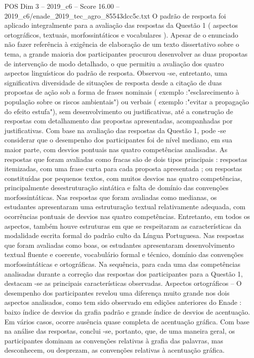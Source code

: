 \begin{textsample}{POS Dim 3 – 2019\_c6 – Score 16.00 – 2019\_c6/enade\_2019\_tec\_agro\_85543dcc5c.txt}
O padrão de resposta foi aplicado integralmente para a avaliação das respostas da Questão 1 ( aspectos ortográficos, textuais, morfossintáticos e vocabulares ).
Apesar de o enunciado não fazer referência à exigência de elaboração de um texto dissertativo sobre o tema, a grande maioria dos participantes procurou desenvolver as duas propostas de intervenção de modo detalhado, o que permitiu a avaliação dos quatro aspectos linguísticos do padrão de resposta.
Observou -se, entretanto, uma significativa diversidade de situações de resposta desde a citação de duas propostas de ação sob a forma de frases nominais ( exemplo :"esclarecimento à população sobre os riscos ambientais") ou verbais ( exemplo :"evitar a propagação do efeito estufa"), sem desenvolvimento ou justificativas, até a construção de respostas com detalhamento das propostas apresentadas, acompanhadas por justificativas.
Com base na avaliação das respostas da Questão 1, pode -se considerar que o desempenho dos participantes foi de nível mediano, em sua maior parte, com desvios pontuais nas quatro competências analisadas.
As respostas que foram avaliadas como fracas são de dois tipos principais : respostas itemizadas, com uma frase curta para cada proposta apresentada ; ou respostas constituídas por pequenos textos, com muitos desvios nas quatro competências, principalmente desestruturação sintática e falta de domínio das convenções morfossintáticas.
Nas respostas que foram avaliadas como medianas, os estudantes apresentaram uma estruturação textual relativamente adequada, com ocorrências pontuais de desvios nas quatro competências.
Entretanto, em todos os aspectos, também houve estruturas em que se respeitaram as características da modalidade escrita formal do padrão culto da Língua Portuguesa.
Nas respostas que foram avaliadas como boas, os estudantes apresentaram desenvolvimento textual fluente e coerente, vocabulário formal e técnico, domínio das convenções morfossintáticas e ortográficas.
Na sequência, para cada uma das competências analisadas durante a correção das respostas dos participantes para a Questão 1, destacam -se as principais características observadas.
Aspectos ortográficos – O desempenho dos participantes revelou uma diferença muito grande nos dois aspectos analisados, como tem sido observado em edições anteriores do Enade : baixo índice de desvios da grafia padrão e grande índice de desvios de acentuação.
Em vários casos, ocorre ausência quase completa de acentuação gráfica.
Com base na análise das respostas, conclui -se, portanto, que, de uma maneira geral, os participantes dominam as convenções relativas à grafia das palavras, mas desconhecem, ou desprezam, as convenções relativas à acentuação gráfica.

\end{textsample}
